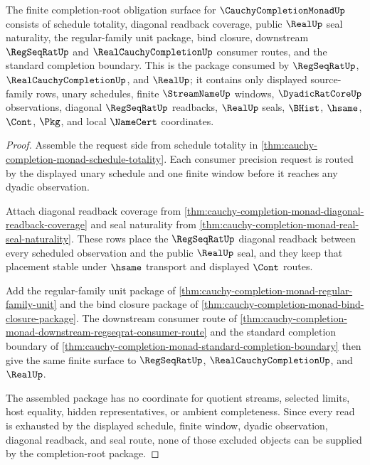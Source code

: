 \begin{theorem}
\label{thm:cauchy-completion-monad-completion-root-unblock}
The finite completion-root obligation surface for $\CauchyCompletionMonadUp$ consists of schedule totality, diagonal readback coverage, public $\RealUp$ seal naturality, the regular-family unit package, bind closure, downstream $\RegSeqRatUp$ and $\RealCauchyCompletionUp$ consumer routes, and the standard completion boundary. This is the package consumed by $\RegSeqRatUp$, $\RealCauchyCompletionUp$, and $\RealUp$; it contains only displayed source-family rows, unary schedules, finite $\StreamNameUp$ windows, $\DyadicRatCoreUp$ observations, diagonal $\RegSeqRatUp$ readbacks, $\RealUp$ seals, $\BHist$, $\hsame$, $\Cont$, $\Pkg$, and local $\NameCert$ coordinates.
\end{theorem}
\begin{proof}
Assemble the request side from schedule totality in \autoref{thm:cauchy-completion-monad-schedule-totality}. Each consumer precision request is routed by the displayed unary schedule and one finite window before it reaches any dyadic observation.

Attach diagonal readback coverage from \autoref{thm:cauchy-completion-monad-diagonal-readback-coverage} and seal naturality from \autoref{thm:cauchy-completion-monad-real-seal-naturality}. These rows place the $\RegSeqRatUp$ diagonal readback between every scheduled observation and the public $\RealUp$ seal, and they keep that placement stable under $\hsame$ transport and displayed $\Cont$ routes.

Add the regular-family unit package of \autoref{thm:cauchy-completion-monad-regular-family-unit} and the bind closure package of \autoref{thm:cauchy-completion-monad-bind-closure-package}. The downstream consumer route of \autoref{thm:cauchy-completion-monad-downstream-regseqrat-consumer-route} and the standard completion boundary of \autoref{thm:cauchy-completion-monad-standard-completion-boundary} then give the same finite surface to $\RegSeqRatUp$, $\RealCauchyCompletionUp$, and $\RealUp$.

The assembled package has no coordinate for quotient streams, selected limits, host equality, hidden representatives, or ambient completeness. Since every read is exhausted by the displayed schedule, finite window, dyadic observation, diagonal readback, and seal route, none of those excluded objects can be supplied by the completion-root package.
\end{proof}

